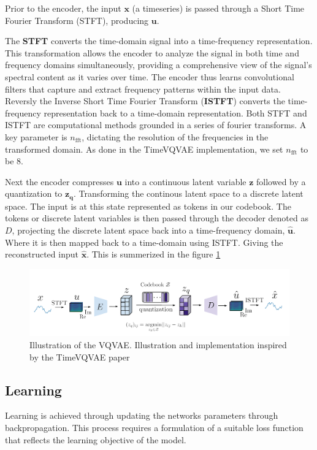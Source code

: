 Prior to the encoder, the input $\mathbf{x}$ (a timeseries) is passed through a Short Time Fourier Transform (STFT), producing $\mathbf{u}$. 

The \textbf{STFT} converts the time-domain signal into a time-frequency representation. This transformation allows the encoder to analyze the signal in both time and frequency domains simultaneously, providing a comprehensive view of the signal's spectral content as it varies over time. 
The encoder thus learns convolutional filters that capture and extract frequency patterns within the input data.
Reversly the Inverse Short Time Fourier Transform (\textbf{ISTFT}) converts the time-frequency representation back to a time-domain representation. 
Both STFT and ISTFT are computational methods grounded in a series of fourier transforms. A key parameter is $n_{\text{fft}}$, dictating the resolution of the frequencies in the transformed domain.
As done in the TimeVQVAE implementation, we set $n_{\text{fft}}$ to be 8.

Next the encoder compresses $\mathbf{u}$ into a continuous latent variable $\mathbf{z}$ followed by a quantization to $\mathbf{z_q}$. Transforming the continous latent space to a discrete latent space. The input is at this state represented as tokens in our codebook.
The tokens or discrete latent variables is then passed through the decoder denoted as $D$, projecting the discrete latent space back into a time-frequency domain, $\hat{\mathbf{u}}$. Where it is then mapped back to a time-domain using ISTFT.
Giving the reconstructed input $\mathbf{\hat{x}}$. This is summerized in the figure \ref{fig:VQVAE}

\begin{center}
\begin{figure}[H]
    \includegraphics[scale=0.8]{figures/figure-pdf/VQVAE.pdf}
    \caption{ Illustration of the VQVAE. Illustration and implementation inspired by the TimeVQVAE paper\cite{lee2023masked} }
    \label{fig:VQVAE}
\end{figure}
\end{center}

\subsection{Learning}
Learning is achieved through updating the networks parameters through backpropagation. This process requires a formulation of a suitable loss function that reflects the learning objective of the model.

